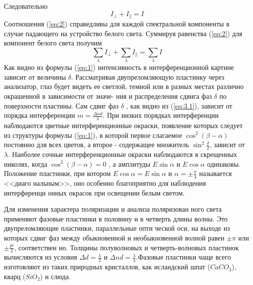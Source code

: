Следовательно
\begin{equation}
\label{eq:2}
I_{\bot}+I_{\|}=I	
\end{equation}
Соотношения (\ref{eq:2}) справедливы для каждой спектральной компоненты в случае падающего на устройство белого света. Суммируя равенства (\ref{eq:2})
для компонент белого света получим
\begin{equation}
	\sum_{\lambda} I_{\bot}+\sum_{\lambda} I_{\|}=\sum_{\lambda} I
\end{equation}
Как видно из формулы (\ref{eq:1}) интенсивность в интерференционной
картине зависит от величины $\delta$. Рассматривая двупреломляющую
пластинку через анализатор, глаз будет видеть ее светлой, темной
или в разных местах различно окрашенной в зависимости от эначе-
ния и распределения сдвига фаз $\delta$ по поверхности пластины.
Сам сдвиг фаз $\delta$ , как видно из (\ref{eq:3.1}), зависит от порядка интерференции
 $m=\frac{\Delta nd}{\lambda}$. При низких порядках интерферен­ции наблюдаются цветные интерференционные окраски, появление ко­торых следует из структуры формулы (\ref{eq:1}), в которой первое слага­емое $\cos^2(\beta-\alpha)$ постоянно для всех цветов, а второе -
содержащее множитель $\sin^2\frac{\delta}{2}$, зависит от $\lambda$. Наиболее сочные интерференционные окраски наблюдаются в скрещенных
николях, когда $\cos^2(\beta-\alpha)=0$ , а амплитуды $E\sin\alpha$
и $E\cos\alpha$ одинаковы. Положение пластинки, при котором
$E\cos\alpha=E\sin\alpha$ и $\alpha=\pm\frac{\pi}{4}$ называется <<диаго­
нальным>>, оно особенно благоприятно для наблюдения интерференци­
онных окрасок при освещении белым светом.

Для изменения характера поляризации и анализа поляризован­
ного света применяют фазовые пластинки в половину и в четверть
длины волны. Это двупреломляющие пластинки, параллельные опти­
ческой оси, на выходе из которых сдвиг фаз между обыкновенной и
необыкновенной волной равен $\pm\pi$ или $\pm\frac{pi}{2}$, соответствен­
но. Толщины полуволновых и четверть-волновых пластинок вычисляются из условия $\Delta d=\frac{\lambda}{2}$ и $\Delta nd=\frac{\lambda}{4}$.Фазовые
пластинки чаще всего изготовляют из таких природных кристаллов,
как исландский шпат ($CaCO_3$), кварц ($SiO_2$) и слюда.

